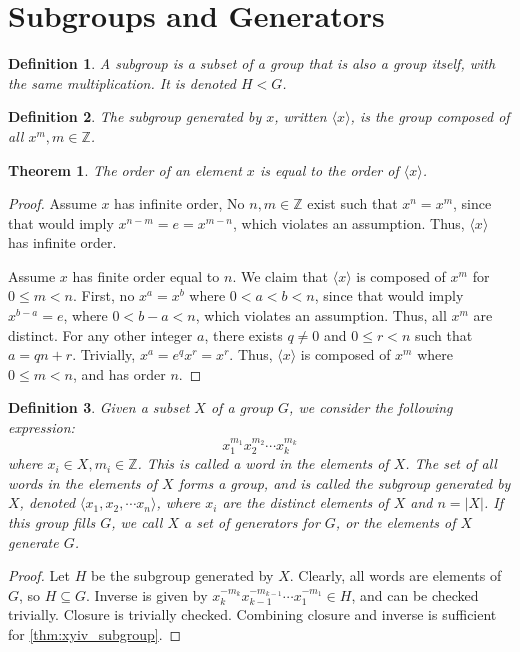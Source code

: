 \documentclass{article}
\newtheorem{theorem}{Theorem}[section]
\newtheorem{definition}{Definition}[section]
\begin{document}
\section{Subgroups and Generators}

\begin{definition}
    A \emph{subgroup} is a subset of a group that is also a group itself, with the same multiplication.
    It is denoted $H < G$.
\end{definition}
\begin{definition}
    The \emph{subgroup generated by $x$}, written $\langle x\rangle$,
    is the group composed of all $x^{m}, m \in \mathbb{Z}$.
\end{definition}

\begin{theorem}
    \label{thm:order_elem_order_subgroup}
    The order of an element $x$ is equal to the order of $\langle x\rangle$.
\end{theorem}
\begin{proof}
    Assume $x$ has infinite order,
    No $n,m \in \mathbb{Z}$ exist such that $x^{n} = x^{m}$, 
    since that would imply $x^{n - m} = e = x^{m - n}$, which violates an assumption.
    Thus, $\langle x\rangle$ has infinite order.

    Assume $x$ has finite order equal to $n$.
    We claim that $\langle x\rangle$ is composed of $x^{m}$ for $0 \le m < n$.
    First, no $x^{a} = x^{b}$ where $0 < a < b < n$,
    since that would imply $x^{b - a} = e$, where $0 < b - a < n$, which violates an assumption.
    Thus, all $x^{m}$ are distinct.
    For any other integer $a$, there exists $q \ne 0$ and $0 \le r < n$ such that $a = qn + r$.
    Trivially, $x^{a} = e^{q}x^{r} = x^{r}$.
    Thus, $\langle x\rangle$ is composed of $x^{m}$ where $0 \le m < n$, and has order $n$.
\end{proof}

\begin{definition}
    Given a subset $X$ of a group $G$, we consider the following expression:
    \[
        x_{1}^{m_{1}}x_{2}^{m_{2}} \cdots x_{k}^{m_{k}}
    \]
    where $x_i \in X, m_i \in \mathbb{Z}$. This is called a \emph{word} in the elements of $X$.
    The set of all words in the elements of $X$ forms a group,
    and is called the \emph{subgroup generated by $X$}, denoted $\langle x_{1},x_{2}, \cdots x_n\rangle$,
    where $x_i$ are the distinct elements of $X$ and $n = |X|$.
    If this group fills $G$, we call $X$ a \emph{set of generators for $G$},
    or \emph{the elements of $X$ generate $G$}.
\end{definition}
\begin{proof}
    Let $H$ be the subgroup generated by $X$.
    Clearly, all words are elements of $G$, so $H \subseteq G$.
    Inverse is given by $x_k^{-m_k}x_{k-1}^{-m_{k-1}} \cdots x_{1}^{-m_1} \in H$, and can be checked trivially.
    Closure is trivially checked.
    Combining closure and inverse is sufficient for \autoref{thm:xyiv_subgroup}.
\end{proof}
\end{document}
